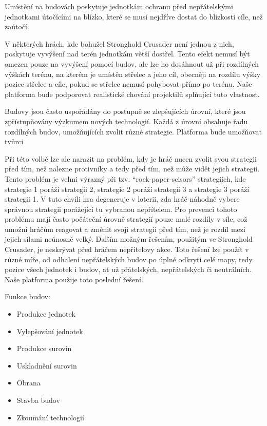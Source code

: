 Umístění na budovách poskytuje jednotkám ochranu před nepřátelskými jednotkami útočícími na blízko, které se musí nejdříve dostat do blízkosti cíle, než zaútočí. 

V některých hrách, kde bohužel Stronghold Crusader není jednou z nich, poskytuje vyvýšení nad terén jednotkám větší dostřel. Tento efekt nemusí být omezen pouze na vyvýšení pomocí budov, ale lze ho dosáhnout už při rozdílných výškách terénu, na kterém je umístěn střelec a jeho cíl, obecněji na rozdílu výšky pozice střelce a cíle, pokud se střelec nemusí pohybovat přímo po terénu. Naše platforma bude podporovat realistické chování projektilů splňující tuto vlastnost. 

Budovy jsou často uspořádány do postupně se zlepšujících úrovní, které jsou zpřístupňovány výzkumem nových technologií.  Každá z úrovní obsahuje řadu rozdílných budov, umožňujících zvolit různé strategie. Platforma bude umožňovat tvůrci  

Při této volbě lze ale narazit na problém, kdy je hráč nucen zvolit svou strategii před tím, než nalezne protivníky a tedy před tím, než může vidět jejich strategii. Tento problém je velmi výrazný při tzv.  ``rock-paper-scisors'' strategiích, kde strategie 1 poráží strategii 2, strategie 2 poráží strategii 3 a strategie 3 poráží strategii 1. V tuto chvíli hra degeneruje v loterii, zda hráč náhodně vybere správnou strategii porážející tu vybranou nepřítelem. Pro prevenci tohoto problému mají často  počáteční úrovně strategií pouze malé rozdíly v síle, což umožní hráčům reagovat a změnit svoji strategii před tím, než je rozdíl mezi jejich silami neúnosně velký. \citep{oxeye03} Dalším možným řešením, použitým ve Stronghold Crusader, je neskrývat před hráčem nepřítelovy akce. Toto řešení lze použít v různé míře, od odhalení nepřátelských budov po úplné odkrytí celé mapy, tedy pozice všech jednotek i budov, ať už přátelských, nepřátelských či neutrálních. Naše platforma použije toto poslední řešení.

Funkce budov:
\begin{itemize}
	\item Produkce jednotek
	\item Vylepšování jednotek
	\item Produkce surovin
	\item Uskladnění surovin
	\item Obrana
	\item Stavba budov
	\item Zkoumání technologií
\end{itemize}

